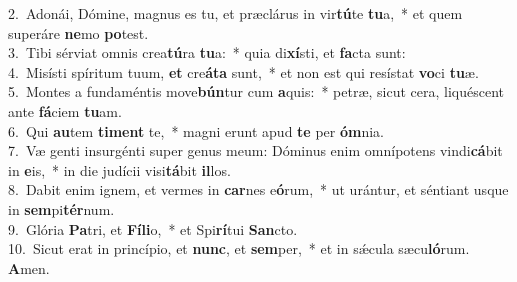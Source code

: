 {2.~}Adonái, Dómine, magnus es tu, et præclárus in vir\textbf{tú}te \textbf{tu}a,~* et quem superáre \textbf{ne}mo \textbf{po}test.\\
{3.~}Tibi sérviat omnis crea\textbf{tú}ra \textbf{tu}a:~* quia di\textbf{xí}sti, et \textbf{fa}cta sunt:\\
{4.~}Misísti spíritum tuum, \textbf{et} cre\textbf{á}\textbf{ta} sunt,~* et non est qui resístat \textbf{vo}ci \textbf{tu}æ.\\
{5.~}Montes a fundaméntis move\textbf{bún}tur cum \textbf{a}quis:~* petræ, sicut cera, liquéscent ante \textbf{fá}ciem \textbf{tu}am.\\
{6.~}Qui \textbf{au}tem \textbf{ti}\textbf{ment} te,~* magni erunt apud \textbf{te} per \textbf{óm}nia.\\
{7.~}Væ genti insurgénti super genus meum: Dóminus enim omnípotens vindi\textbf{cá}bit in \textbf{e}is,~* in die judícii visi\textbf{tá}bit \textbf{il}los.\\
{8.~}Dabit enim ignem, et vermes in \textbf{car}nes e\textbf{ó}rum,~* ut urántur, et séntiant usque in \textbf{sem}pi\textbf{tér}num.\\
{9.~}Glória \textbf{Pa}tri, et \textbf{Fí}\textbf{li}o,~* et Spi\textbf{rí}tui \textbf{San}cto.\\
{10.~}Sicut erat in princípio, et \textbf{nunc}, et \textbf{sem}per,~* et in sǽcula sæcu\textbf{ló}rum. \textbf{A}men.\\
